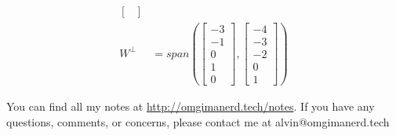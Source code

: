 \documentclass{math}
\begin{document}
\begin{align*}
\begin{bmatrix}
  \end{bmatrix} \\
  W^{\bot} &= span\left(\begin{bmatrix}
    -3 \\ -1 \\ 0 \\ 1 \\ 0
  \end{bmatrix},\begin{bmatrix}
    -4 \\ -3 \\ -2 \\ 0 \\ 1
  \end{bmatrix}\right)
\end{align*}

\begin{center}
  You can find all my notes at \url{http://omgimanerd.tech/notes}. If you have
  any questions, comments, or concerns, please contact me at
  alvin@omgimanerd.tech
\end{center}
\end{document}
